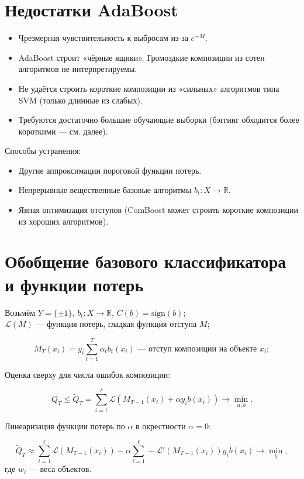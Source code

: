 \section*{Недостатки AdaBoost}

\begin{itemize}
    \item Чрезмерная чувствительность к выбросам из-за $e^{-M}$.
    \item AdaBoost строит «чёрные ящики». Громоздкие композиции из сотен алгоритмов не интерпретируемы.
    \item Не удаётся строить короткие композиции из «сильных» алгоритмов типа SVM (только длинные из слабых).
    \item Требуются достаточно большие обучающие выборки (бэггинг обходится более короткими — см. далее).
\end{itemize}

Способы устранения:
\begin{itemize}
    \item Другие аппроксимации пороговой функции потерь.
    \item Непрерывные вещественные базовые алгоритмы $b_t: X \to \mathbb{R}$.
    \item Явная оптимизация отступов (ComBoost может строить короткие композиции из хороших алгоритмов).
\end{itemize}

\section*{Обобщение базового классификатора и функции потерь}

Возьмём $Y = \{\pm 1\}$, $b_t : X \to \mathbb{R}$, $C(b) = \text{sign}(b)$;\\
$\mathcal{L}(M)$ — функция потерь, гладкая функция отступа $M$;

\[
    M_T(x_i) = y_i \sum_{t=1}^{T} \alpha_t b_t(x_i) \text{ — отступ композиции на объекте } x_i;
\]

Оценка сверху для числа ошибок композиции:

\[
    Q_T \leq \tilde{Q}_T = \sum_{i=1}^{\ell} \mathcal{L}(M_{T-1}(x_i) + \alpha y_i b(x_i)) \to \min_{\alpha, b}.
\]

Линеаризация функции потерь по $\alpha$ в окрестности $\alpha = 0$:

\[
    \tilde{Q}_T \approx \sum_{i=1}^{\ell} \mathcal{L}(M_{T-1}(x_i)) - \alpha \sum_{i=1}^{\ell} -\mathcal{L}'(M_{T-1}(x_i)) y_i b(x_i) \to \min_{b},
\]
где $w_i$ — веса объектов.

